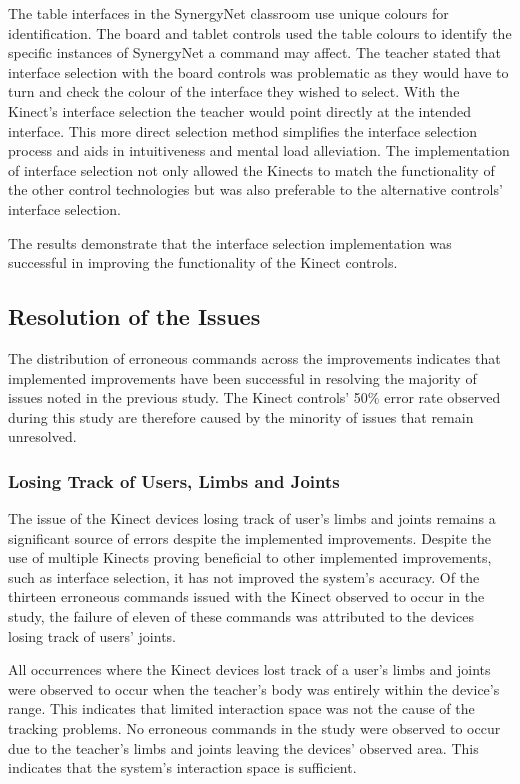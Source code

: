 \documentclass[manuscript, review, screen]{acmart}
\begin{document}
The table interfaces in the SynergyNet classroom use unique colours for identification.
The board and tablet controls used the table colours to identify the specific instances of SynergyNet a command may affect.
The teacher stated that interface selection with the board controls was problematic as they would have to turn and check the colour of the interface they wished to select.
With the Kinect's interface selection the teacher would point directly at the intended interface.
This more direct selection method simplifies the interface selection process and aids in intuitiveness and mental load alleviation.
The implementation of interface selection not only allowed the Kinects to match the functionality of the other control technologies but was also preferable to the alternative controls' interface selection.

The results demonstrate that the interface selection implementation was successful in improving the functionality of the Kinect controls.

\subsection{Resolution of the Issues}

The distribution of erroneous commands across the improvements indicates that implemented improvements have been successful in resolving the majority of issues noted in the previous study.
The Kinect controls' 50\% error rate observed during this study are therefore caused by the minority of issues that remain unresolved.

\subsubsection{Losing Track of Users, Limbs and Joints}
\label{discussion:issue:tracking}

The issue of the Kinect devices losing track of user's limbs and joints remains a significant source of errors despite the implemented improvements.
Despite the use of multiple Kinects proving beneficial to other implemented improvements, such as interface selection, it has not improved the system's accuracy.
Of the thirteen erroneous commands issued with the Kinect observed to occur in the study, the failure of eleven of these commands was attributed to the devices losing track of users' joints.

All occurrences where the Kinect devices lost track of a user's limbs and joints were observed to occur when the teacher's body was entirely within the device's range.
This indicates that limited interaction space was not the cause of the tracking problems.
No erroneous commands in the study were observed to occur due to the teacher's limbs and joints leaving the devices' observed area.
This indicates that the system's interaction space is sufficient.
\end{document}
